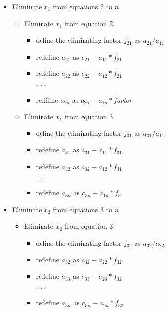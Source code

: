 \documentclass[11pt]{article}
\begin{document}
\begin{description}
\begin{itemize}
			\begin{itemize}
				\item  Eliminate $x_1$ from equations $2$ to $n$
					\begin{itemize}
						\item Eliminate $x_1$ from equation $2$
							\begin{itemize}
								\item define the eliminating factor $f_{21}$ as $a_{21}/a_{11}$
								\item redefine $a_{21}$ as $a_{21}-a_{11}*f_{21}$
								\item redefine $a_{22}$ as $a_{22}-a_{12}*f_{21}$ \\
								. . . 
								\item redifine $a_{2n}$ as $a_{2n}-a_{1n}*factor$ \\
							\end{itemize}
						\item Eliminate $x_1$ from equation $3$
							\begin{itemize}
								\item define the eliminating factor $f_{31}$ as $a_{31}/a_{11}$
								\item redefine $a_{31}$ as $a_{31}-a_{11}*f_{31}$
								\item redefine $a_{32}$ as $a_{32}-a_{12}*f_{31}$ \\
								 . . .
								\item redefine $a_{3n}$ as $a_{3n}-a_{1n}*f_{31}$ \\
							\end{itemize}	
					\end{itemize}
				\item   Eliminate $x_2$ from equations $3$ to $n$ \\
				\begin{itemize}
						\item Eliminate $x_2$ from equation $3$
					\begin{itemize}
						\item define the eliminating factor $f_{32}$ as $a_{32}/a_{22}$
						\item redefine $a_{32}$ as $a_{32}-a_{22}*f_{32}$
						\item redefine $a_{33}$ as $a_{33}-a_{23}*f_{32}$\\
						. . .
						\item redefine $a_{3n}$ as $a_{3n}-a_{2n}*f_{32}$ \\
						
					\end{itemize}
				

\end{itemize}
\end{itemize}
\end{itemize}
\end{description}
\end{document}
